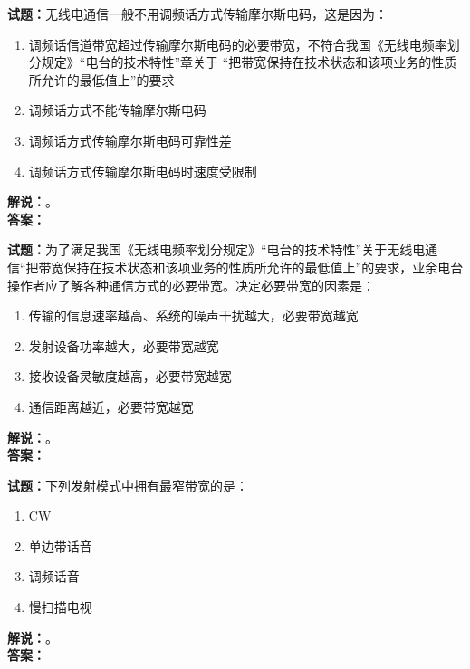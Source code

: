 \documentclass{ctexbook}
\begin{document}
\vspace{\baselineskip}

\noindent\textbf{试题：}无线电通信一般不用调频话方式传输摩尔斯电码，这是因为：
\begin{enumerate}[leftmargin=3em]
  \item 调频话信道带宽超过传输摩尔斯电码的必要带宽，不符合我国《无线电频率划分规定》“电台的技术特性”章关于 “把带宽保持在技术状态和该项业务的性质所允许的最低值上”的要求
  \item 调频话方式不能传输摩尔斯电码
  \item 调频话方式传输摩尔斯电码可靠性差
  \item 调频话方式传输摩尔斯电码时速度受限制
\end{enumerate}
\noindent\textbf{解说：}\textbf{}。\\\noindent\textbf{答案：}

\vspace{\baselineskip}

\noindent\textbf{试题：}为了满足我国《无线电频率划分规定》“电台的技术特性”关于无线电通信“把带宽保持在技术状态和该项业务的性质所允许的最低值上”的要求，业余电台操作者应了解各种通信方式的必要带宽。决定必要带宽的因素是：
\begin{enumerate}[leftmargin=3em]
  \item  传输的信息速率越高、系统的噪声干扰越大，必要带宽越宽
  \item  发射设备功率越大，必要带宽越宽
  \item  接收设备灵敏度越高，必要带宽越宽
  \item  通信距离越近，必要带宽越宽
\end{enumerate}
\noindent\textbf{解说：}\textbf{}。\\\noindent\textbf{答案：}

\vspace{\baselineskip}

\noindent\textbf{试题：}下列发射模式中拥有最窄带宽的是：
\begin{enumerate}[leftmargin=3em]
  \item CW
  \item 单边带话音
  \item 调频话音
  \item 慢扫描电视
\end{enumerate}
\noindent\textbf{解说：}\textbf{}。\\\noindent\textbf{答案：}

\vspace{\baselineskip}
\end{document}
